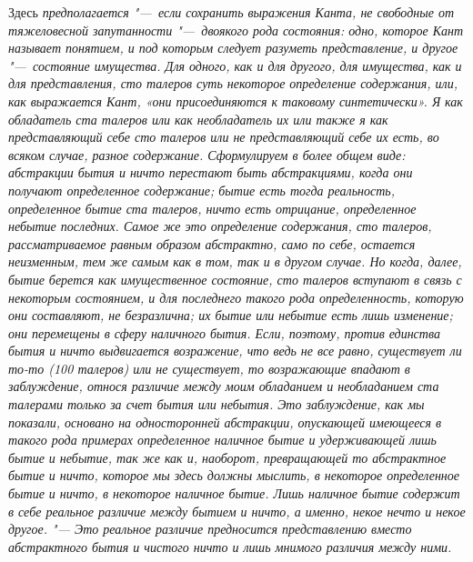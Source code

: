 Здесь \em{предполагается} "---~если сохранить выражения
Канта, не свободные от тяжеловесной запутанности "---~двоякого рода состояния:
одно, которое Кант называет понятием, и под которым следует разуметь
представление, и другое "---~состояние имущества. Для одного, как и для
другого, для имущества, как и для представления, сто талеров суть некоторое
определение содержания, или, как выражается Кант, «они присоединяются к
таковому \em{синтетически}». Я как
\em{обладатель} ста талеров или как необладатель их
или также я как \em{представляющий} себе сто талеров
или не представляющий себе их есть, во всяком случае, разное содержание.
Сформулируем в более общем виде: абстракции бытия и ничто перестают быть
абстракциями, когда они получают определенное содержание; бытие есть тогда
реальность, определенное бытие ста талеров, ничто есть отрицание,
определенное небытие последних. Самое же это определение содержания, сто
талеров, рассматриваемое равным образом абстрактно, само по себе, остается
неизменным, тем же самым как в том, так и в другом случае. Но когда, далее,
бытие берется как имущественное состояние, сто талеров вступают в связь с
некоторым состоянием, и для последнего такого рода определенность, которую
они составляют, не безразлична; их бытие или небытие есть лишь
\em{изменение}; они перемещены в сферу
\em{наличного бытия}. Если, поэтому, против единства
бытия и ничто выдвигается возражение, что ведь не все равно, существует ли
то-то (100 талеров) или не существует, то возражающие впадают в
заблуждение, относя различие между моим
\em{обладанием} и
\em{необладанием} ста талерами только за счет бытия
или небытия. Это заблуждение, как мы показали, основано на односторонней
абстракции, опускающей имеющееся в такого рода примерах
\em{определенное наличное бытие} и удерживающей лишь
бытие и небытие, так же как и, наоборот, превращающей то абстрактное бытие
и ничто, которое мы здесь должны мыслить, в некоторое определенное бытие и
ничто, в некоторое наличное бытие. Лишь наличное бытие содержит в себе
реальное различие между бытием и ничто, а именно, некое
\em{нечто} и некое \em{другое}. "---
Это реальное различие предносится представлению вместо абстрактного бытия и
чистого ничто и лишь мнимого различия между ними.

